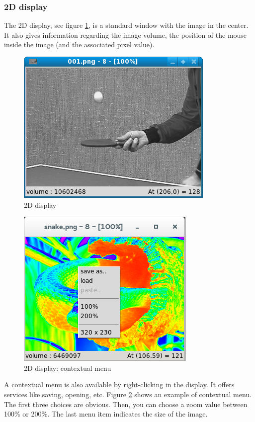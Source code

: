 \documentclass[a4paper,10pt,oneside]{article}
\begin{document}
\subsubsection{2D display}

The 2D display, see figure \ref{fig:dis2D}, is a standard window with the image
in the center. It also gives information regarding the image volume, the position of
the mouse inside the image (and the associated pixel value).

\begin{figure}
\centering
\includegraphics[scale=0.5]{images/dis2D.png}
\caption{2D display}
\label{fig:dis2D}
\end{figure}


\begin{figure}
\centering
\includegraphics[scale=0.5]{images/dis2D_menu.png}
\caption{2D display: contextual menu}
\label{fig:dis2D_menu}
\end{figure}

A contextual menu is also available by right-clicking in the display. It offers
services like saving, opening, etc. Figure \ref{fig:dis2D_menu} shows an example of 
contextual menu. The first three choices are obvious. Then, you can choose a zoom
value between 100\% or 200\%. The last menu item indicates the size of
the image.
\end{document}
